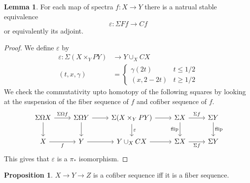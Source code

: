 \documentclass[notitlepage,12pt]{article}
\theoremstyle{definition}
\newtheorem{lemma}[theorem]{Lemma}
\newtheorem{proposition}[theorem]{Proposition}
\theoremstyle{para}{\normalfont}
\begin{document}
\begin{lemma}
    For each map of spectra $f:X\to Y$ there is a natrual stable equivalence 
    \[
        \varepsilon:\Sigma Ff\to Cf
    \] or equivalently its adjoint. 
\end{lemma}
\begin{proof}
     We define $\varepsilon$ by
     \begin{align*}
        \varepsilon: \Sigma(X\times_Y PY )&\to Y\cup_X CX \\
            (t,x,\gamma)&=\begin{cases}
                \gamma(2t)&t\leq 1/2 \\
                (x,2-2t)& t\geq 1/2
            \end{cases}
     \end{align*}
We check the commutativity upto homotopy of the following squares by looking  at the suspension of the fiber sequence of $f$ and cofiber sequence of $f$. 
     \[\begin{tikzcd}
	{\Sigma\Omega X} & {\Sigma\Omega Y} & {\Sigma(X\times_Y PY)} & {\Sigma X} & {\Sigma Y} \\
	X & Y & {Y\cup_X CX} & {\Sigma X} & {\Sigma Y}
	\arrow["{\Sigma\Omega f}", from=1-1, to=1-2]
	\arrow[from=1-2, to=1-3]
	\arrow["f"', from=2-1, to=2-2]
	\arrow[from=1-1, to=2-1]
	\arrow[from=1-2, to=2-2]
	\arrow["\varepsilon", from=1-3, to=2-3]
	\arrow[from=2-2, to=2-3]
	\arrow[from=1-3, to=1-4]
	\arrow[from=2-3, to=2-4]
	\arrow["{\text{flip}}"', from=1-4, to=2-4]
	\arrow["{\text{flip}}", from=1-5, to=2-5]
	\arrow["{\Sigma f}"', from=2-4, to=2-5]
	\arrow["{\Sigma f}", from=1-4, to=1-5]
\end{tikzcd}\]This gives that $\varepsilon$ is a $\pi_*$ isomorphism. 
\end{proof}

\begin{proposition}
    $X\to Y\to Z$ is a cofiber sequence iff it is a fiber sequence. 
\end{proposition}
\end{document}
